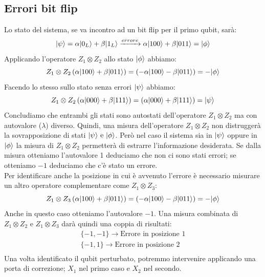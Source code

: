 \documentclass[12pt, a4paper]{report}
\begin{document}
\subsection{Errori bit flip}
Lo stato del sistema, se va incontro ad un bit flip per il primo qubit, sarà:
\begin{equation*}
    | \psi \rangle = \alpha| 0_{L} \rangle + \beta| 1_{L} \rangle \xrightarrow{errore} \alpha| 100 \rangle + \beta| 011 \rangle = | \phi \rangle
\end{equation*}
Applicando l'operatore $Z_{1}\otimes Z_{2}$ allo stato $| \phi \rangle$ abbiamo:
\begin{equation*}
    Z_{1}\otimes Z_{2}\left(\alpha| 100 \rangle + \beta| 011 \rangle\right) = \left(-\alpha| 100 \rangle-\beta| 011 \rangle\right) = -| \phi \rangle
\end{equation*}
Facendo lo stesso sullo stato senza errori $| \psi \rangle$ abbiamo:
\begin{equation*}
    Z_{1}\otimes Z_{2}\left(\alpha| 000 \rangle + \beta| 111 \rangle\right) = \left(\alpha| 000 \rangle+\beta| 111 \rangle\right) = | \psi \rangle
\end{equation*}
Concludiamo che entrambi gli stati sono autostati dell'operatore $Z_{1}\otimes Z_{2}$ ma con autovalore ($\lambda$) diverso. Quindi, una misura dell'operatore $Z_{1}\otimes Z_{2}$ non distruggerà la sovrapposizione di stati $| \psi \rangle\text{ e }| \phi \rangle$. Però nel caso il sistema sia in  $| \psi \rangle$ oppure in $| \phi \rangle$ la misura di $Z_{1}\otimes Z_{2}$ permetterà di estrarre l'informazione desiderata. Se dalla misura otteniamo l'autovalore 1 deduciamo che non ci sono stati errori; se otteniamo $-1$ deduciamo che c'è stato un errore.\\
Per identificare anche la posizione in cui è avvenuto l'errore è necessario misurare un altro operatore complementare come $Z_{1}\otimes Z_{3}$:
\begin{equation*}
    Z_{1}\otimes Z_{3}\left(\alpha| 100 \rangle + \beta| 011 \rangle\right) = \left(-\alpha| 100 \rangle-\beta| 011 \rangle\right) = -| \phi \rangle
\end{equation*}
Anche in questo caso otteniamo l'autovalore $-1$. Una misura combinata di $Z_{1}\otimes Z_{2}$ e $Z_{1}\otimes Z_{3}$ darà quindi una coppia di risultati:
\begin{equation*}
    \begin{split}
        \{-1,-1\} \rightarrow \text{Errore in posizione 1} \\
        \{-1,1\} \rightarrow \text{Errore in posizione 2} \\
    \end{split}
\end{equation*}
Una volta identificato il qubit perturbato, potremmo intervenire applicando una porta di correzione; $X_{1}$ nel primo caso e $X_{2}$ nel secondo.
\end{document}
